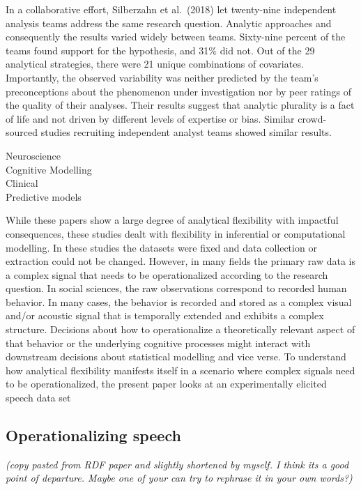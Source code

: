 \documentclass[
  english,
  man]{apa6}
\begin{document}
In a collaborative effort, Silberzahn et al.~(2018) let twenty-nine independent analysis teams address the same research question.
Analytic approaches and consequently the results varied widely between teams.
Sixty-nine percent of the teams found support for the hypothesis, and 31\% did not.
Out of the 29 analytical strategies, there were 21 unique combinations of covariates.
Importantly, the observed variability was neither predicted by the team's preconceptions about the phenomenon under investigation nor by peer ratings of the quality of their analyses.
Their results suggest that analytic plurality is a fact of life and not driven by different levels of expertise or bias.
Similar crowd-sourced studies recruiting independent analyst teams showed similar results.

Neuroscience\\
Cognitive Modelling\\
Clinical\\
Predictive models

While these papers show a large degree of analytical flexibility with impactful consequences, these studies dealt with flexibility in inferential or computational modelling.
In these studies the datasets were fixed and data collection or extraction could not be changed.
However, in many fields the primary raw data is a complex signal that needs to be operationalized according to the research question.
In social sciences, the raw observations correspond to recorded human behavior.
In many cases, the behavior is recorded and stored as a complex visual and/or acoustic signal that is temporally extended and exhibits a complex structure.
Decisions about how to operationalize a theoretically relevant aspect of that behavior or the underlying cognitive processes might interact with downstream decisions about statistical modelling and vice verse.
To understand how analytical flexibility manifests itself in a scenario where complex signals need to be operationalized, the present paper looks at an experimentally elicited speech data set

\hypertarget{operationalizing-speech}{%
\subsection{Operationalizing speech}\label{operationalizing-speech}}

\emph{(copy pasted from RDF paper and slightly shortened by myself. I think its a good point of departure. Maybe one of your can try to rephrase it in your own words?)}
\end{document}

